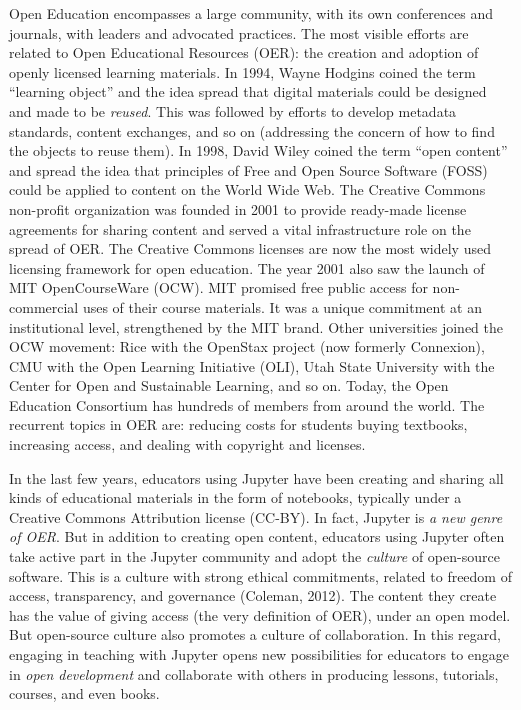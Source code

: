 \documentclass[]{book}
\begin{document}
Open Education encompasses a large community, with its own conferences
and journals, with leaders and advocated practices. The most visible
efforts are related to Open Educational Resources (OER): the creation
and adoption of openly licensed learning materials. In 1994, Wayne
Hodgins coined the term ``learning object'' and the idea spread that
digital materials could be designed and made to be \emph{reused}. This
was followed by efforts to develop metadata standards, content
exchanges, and so on (addressing the concern of how to find the objects
to reuse them). In 1998, David Wiley coined the term ``open content''
and spread the idea that principles of Free and Open Source Software
(FOSS) could be applied to content on the World Wide Web. The Creative
Commons non-profit organization was founded in 2001 to provide
ready-made license agreements for sharing content and served a vital
infrastructure role on the spread of OER. The Creative Commons licenses
are now the most widely used licensing framework for open education. The
year 2001 also saw the launch of MIT OpenCourseWare (OCW). MIT promised
free public access for non-commercial uses of their course materials. It
was a unique commitment at an institutional level, strengthened by the
MIT brand. Other universities joined the OCW movement: Rice with the
OpenStax project (now formerly Connexion), CMU with the Open Learning
Initiative (OLI), Utah State University with the Center for Open and
Sustainable Learning, and so on. Today, the Open Education Consortium
has hundreds of members from around the world. The recurrent topics in
OER are: reducing costs for students buying textbooks, increasing
access, and dealing with copyright and licenses.

In the last few years, educators using Jupyter have been creating and
sharing all kinds of educational materials in the form of notebooks,
typically under a Creative Commons Attribution license (CC-BY). In fact,
Jupyter is \emph{a new genre of OER}. But in addition to creating open
content, educators using Jupyter often take active part in the Jupyter
community and adopt the \emph{culture} of open-source software. This is
a culture with strong ethical commitments, related to freedom of access,
transparency, and governance (Coleman, 2012). The content they create
has the value of giving access (the very definition of OER), under an
open model. But open-source culture also promotes a culture of
collaboration. In this regard, engaging in teaching with Jupyter opens
new possibilities for educators to engage in \emph{open development} and
collaborate with others in producing lessons, tutorials, courses, and
even books.
\end{document}
